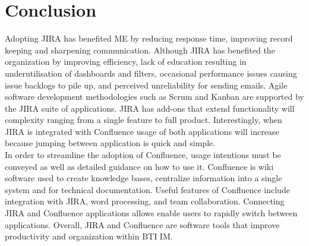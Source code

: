 \section{Conclusion}
Adopting JIRA has benefited ME by reducing response time, improving record keeping and sharpening communication. Although JIRA has benefited the organization by improving efficiency, lack of education resulting in underutilisation of dashboards and filters, occasional performance issues causing issue backlogs to pile up, and perceived unreliability for sending emails.  Agile software development methodologies such as Scrum and Kanban are supported by the JIRA suite of applications. JIRA has add-ons that extend functionality will complexity ranging from a single feature to full product.  Interestingly, when JIRA is integrated with Confluence usage of both applications will increase because jumping between application is quick and simple. \\

In order to streamline the adoption of \gls{Confluence}, usage intentions must be conveyed as well as detailed guidance on how to use it. Confluence is wiki software used to create knowledge bases, centralize information into a single system and for technical documentation. Useful features of Confluence include integration with \gls{JIRA}, word processing, and team collaboration.  Connecting JIRA and Confluence applications allows enable users to rapidly switch between applications.  Overall, JIRA and Confluence are software tools that improve productivity and organization within BTI IM.